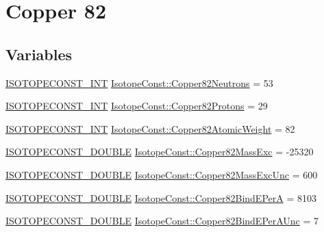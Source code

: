 \hypertarget{group___isotope_const-_copper-_cu82}{}\section{Copper 82}
\label{group___isotope_const-_copper-_cu82}
\subsection*{Variables}
\begin{DoxyCompactItemize}
\item 
\mbox{\hyperlink{group___isotope_const-_macros_ga5f18360b3e99483a35c32d789e62621c}{I\+S\+O\+T\+O\+P\+E\+C\+O\+N\+S\+T\+\_\+\+I\+NT}} \mbox{\hyperlink{group___isotope_const-_copper-_cu82_ga357e56fadf7d85a80e4130943870f267}{Isotope\+Const\+::\+Copper82\+Neutrons}} = 53
\item 
\mbox{\hyperlink{group___isotope_const-_macros_ga5f18360b3e99483a35c32d789e62621c}{I\+S\+O\+T\+O\+P\+E\+C\+O\+N\+S\+T\+\_\+\+I\+NT}} \mbox{\hyperlink{group___isotope_const-_copper-_cu82_ga74b5fa74f2a59a6c6d300122853dd0dc}{Isotope\+Const\+::\+Copper82\+Protons}} = 29
\item 
\mbox{\hyperlink{group___isotope_const-_macros_ga5f18360b3e99483a35c32d789e62621c}{I\+S\+O\+T\+O\+P\+E\+C\+O\+N\+S\+T\+\_\+\+I\+NT}} \mbox{\hyperlink{group___isotope_const-_copper-_cu82_ga44e384572dc619518748e7ac915c2219}{Isotope\+Const\+::\+Copper82\+Atomic\+Weight}} = 82
\item 
\mbox{\hyperlink{group___isotope_const-_macros_ga8f45a7272ce02c0b4c65c44636ed719a}{I\+S\+O\+T\+O\+P\+E\+C\+O\+N\+S\+T\+\_\+\+D\+O\+U\+B\+LE}} \mbox{\hyperlink{group___isotope_const-_copper-_cu82_gad3d82810f51f3d0fb63e365e4d2234f7}{Isotope\+Const\+::\+Copper82\+Mass\+Exc}} = -\/25320
\item 
\mbox{\hyperlink{group___isotope_const-_macros_ga8f45a7272ce02c0b4c65c44636ed719a}{I\+S\+O\+T\+O\+P\+E\+C\+O\+N\+S\+T\+\_\+\+D\+O\+U\+B\+LE}} \mbox{\hyperlink{group___isotope_const-_copper-_cu82_ga4c34126c17f808babfbd3f2adafbff74}{Isotope\+Const\+::\+Copper82\+Mass\+Exc\+Unc}} = 600
\item 
\mbox{\hyperlink{group___isotope_const-_macros_ga8f45a7272ce02c0b4c65c44636ed719a}{I\+S\+O\+T\+O\+P\+E\+C\+O\+N\+S\+T\+\_\+\+D\+O\+U\+B\+LE}} \mbox{\hyperlink{group___isotope_const-_copper-_cu82_ga4760931f1dee009914f2708ebb57422e}{Isotope\+Const\+::\+Copper82\+Bind\+E\+PerA}} = 8103
\item 
\mbox{\hyperlink{group___isotope_const-_macros_ga8f45a7272ce02c0b4c65c44636ed719a}{I\+S\+O\+T\+O\+P\+E\+C\+O\+N\+S\+T\+\_\+\+D\+O\+U\+B\+LE}} \mbox{\hyperlink{group___isotope_const-_copper-_cu82_ga016c0dc5960544222d7f65b5e436cb15}{Isotope\+Const\+::\+Copper82\+Bind\+E\+Per\+A\+Unc}} = 7

\end{DoxyCompactItemize}
